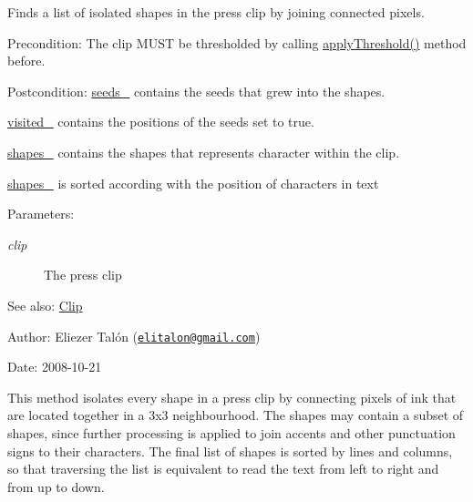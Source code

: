 Finds a list of isolated shapes in the press clip by joining connected pixels. 

\begin{Desc}
\item[Precondition:]The clip MUST be thresholded by calling \hyperlink{class_segmenter_6854315e3320f9d9a8ece14cbb8570ee}{applyThreshold()} method before.\end{Desc}
\begin{Desc}
\item[Postcondition:]\hyperlink{class_segmenter_7859d050250b9fdf7c96374f80008d6e}{seeds\_\-} contains the seeds that grew into the shapes. 

\hyperlink{class_segmenter_fe4dd18749f268aae2b26a1abff6a607}{visited\_\-} contains the positions of the seeds set to true. 

\hyperlink{class_segmenter_41b94ede2829063e0937dc150756e77e}{shapes\_\-} contains the shapes that represents character within the clip. 

\hyperlink{class_segmenter_41b94ede2829063e0937dc150756e77e}{shapes\_\-} is sorted according with the position of characters in text\end{Desc}
\begin{Desc}
\item[Parameters:]
\begin{description}
\item[{\em clip}]The press clip\end{description}
\end{Desc}
\begin{Desc}
\item[See also:]\hyperlink{class_clip}{Clip}\end{Desc}
\begin{Desc}
\item[Author:]Eliezer Talón (\href{mailto:elitalon@gmail.com}{\tt elitalon@gmail.com}) \end{Desc}
\begin{Desc}
\item[Date:]2008-10-21\end{Desc}
This method isolates every shape in a press clip by connecting pixels of ink that are located together in a 3x3 neighbourhood. The shapes may contain a subset of shapes, since further processing is applied to join accents and other punctuation signs to their characters. The final list of shapes is sorted by lines and columns, so that traversing the list is equivalent to read the text from left to right and from up to down. 

